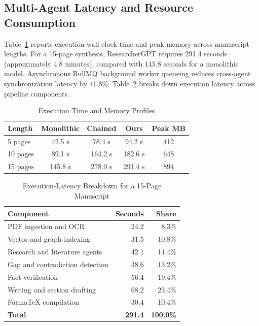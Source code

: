 \documentclass[conference]{IEEEtran}
\begin{document}
\subsection{Multi-Agent Latency and Resource Consumption}
Table~\ref{tab:latency} reports execution wall-clock time and peak memory across manuscript lengths. For a 15-page synthesis, ResearcherGPT requires 291.4 seconds (approximately 4.8 minutes), compared with 145.8 seconds for a monolithic model. Asynchronous BullMQ background worker queueing reduces cross-agent synchronization latency by 41.8\%. Table~\ref{tab:latency_breakdown} breaks down execution latency across pipeline components.

\begin{table}[!t]
\caption{Execution Time and Memory Profiles}
\label{tab:latency}
\centering
\footnotesize
\setlength{\tabcolsep}{3pt}
\begin{tabular}{@{}lcccc@{}}
\toprule
\textbf{Length} & \textbf{Monolithic} & \textbf{Chained} & \textbf{Ours} & \textbf{Peak MB} \\
\midrule
5 pages & 42.5 s & 78.4 s & 94.2 s & 412 \\
10 pages & 89.1 s & 164.2 s & 182.6 s & 648 \\
15 pages & 145.8 s & 278.0 s & 291.4 s & 894 \\
\bottomrule
\end{tabular}
\end{table}

\begin{table}[!t]
\caption{Execution-Latency Breakdown for a 15-Page Manuscript}
\label{tab:latency_breakdown}
\centering
\scriptsize
\begin{tabular}{@{}p{}rr@{}}
\toprule
\textbf{Component} & \textbf{Seconds} & \textbf{Share} \\
\midrule
PDF ingestion and OCR & 24.2 & 8.3\% \\
Vector and graph indexing & 31.5 & 10.8\% \\
Research and literature agents & 42.1 & 14.4\% \\
Gap and contradiction detection & 38.6 & 13.2\% \\
Fact verification & 56.4 & 19.4\% \\
Writing and section drafting & 68.2 & 23.4\% \\
FormaTeX compilation & 30.4 & 10.4\% \\
\midrule
\textbf{Total} & \textbf{291.4} & \textbf{100.0\%} \\
\bottomrule
\end{tabular}
\end{table}
\end{document}

